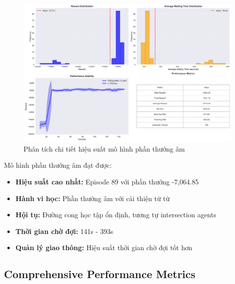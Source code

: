 \begin{figure}[!htp]
    \centering
    \includegraphics[width=\textwidth]{figures/sync_negative_model_summary.png}
    \caption{Phân tích chi tiết hiệu suất mô hình phần thưởng âm}
    \label{fig:sync_negative_model_summary}
\end{figure}

Mô hình phần thưởng âm đạt được:
\begin{itemize}
    \item \textbf{Hiệu suất cao nhất:} Episode 89 với phần thưởng -7,064.85

    \item \textbf{Hành vi học:} Phần thưởng âm với cải thiện từ từ

    \item \textbf{Hội tụ:} Đường cong học tập ổn định, tương tự intersection agents

    \item \textbf{Thời gian chờ đợi:} 141s - 393s

    \item \textbf{Quản lý giao thông:} Hiệu suất thời gian chờ đợi tốt hơn
\end{itemize}

\subsection{Comprehensive Performance Metrics}

